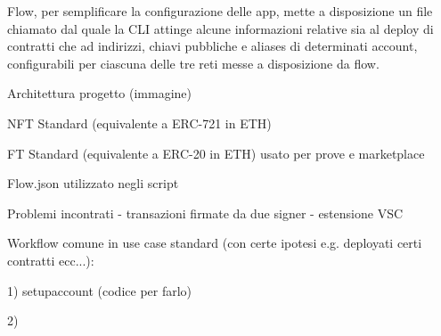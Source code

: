 Flow, per semplificare la configurazione delle app, mette a disposizione un file chiamato  dal quale la CLI attinge alcune informazioni relative sia al deploy di contratti che ad indirizzi, chiavi pubbliche e aliases di determinati account, configurabili per ciascuna delle tre reti messe a disposizione da flow.





Architettura progetto (immagine)

NFT Standard (equivalente a ERC-721 in ETH)

FT Standard (equivalente a ERC-20 in ETH) usato per prove e marketplace

Flow.json utilizzato negli script

Problemi incontrati 
 - transazioni firmate da due signer
 - estensione VSC

Workflow comune in use case standard (con certe ipotesi e.g. deployati certi contratti ecc...):

1) setupaccount (codice per farlo)

2) 



